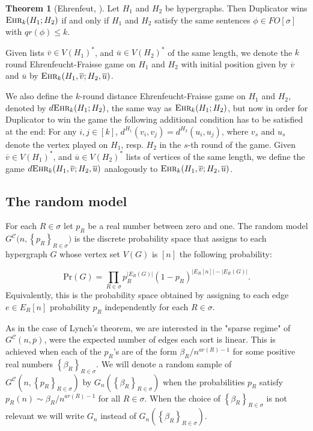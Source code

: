 \documentclass[12pt,notitlepage,a4paper]{article}
\theoremstyle{definition}
\newtheorem{theorem}{Theorem}[section]
\newcommand{\ehr}{\textsc{Ehr}}
\newcommand{\InR}[1]{\left\{ #1_R \right\}_{R\in \sigma}}
\begin{document}
\begin{theorem}
	[Ehrenfeut, \citealp{ehrenfeucht1961application}] Let
	$H_1$ and $H_2$ be hypergraphs.
	Then Duplicator wins $\ehr_k(H_1;H_2)$
	if and only if $H_1$ and $H_2$ satisfy the same 
	sentences $\phi\in FO[\sigma]$ with $qr(\phi)\leq k$.		
\end{theorem}

Given lists $\overline{v}\in V(H_1)^*$, and 
$\overline{u}\in V(H_2)^*$ of the same length, 
we denote the $k$ round 
Ehrenfeucht-Fraisse game on $H_1$ and $H_2$ with initial position given
by $\overline{v}$ and $\overline{u}$ by $\ehr_k(H_1,\overline{v};H_2,\overline{u})$.\par

We also define the $k$-round distance Ehrenfeucht-Fraisse game on 
$H_1$ and $H_2$, denoted by $d\ehr_k(H_1;H_2)$, the same way as
$\ehr_k(H_1;H_2)$, but now in order for Duplicator to win the
game the following additional condition has to be satisfied 
at the end: For any $i,j\in [k]$, $d^{H_1}(v_i,v_j)=d^{H_2}(u_i,u_j)$,
where $v_s$ and $u_s$ denote the vertex played on $H_1$, resp. $H_2$ in the 
$s$-th round of the game. 
Given $\overline{v}\in V(H_1)^*$, and $\overline{u}\in V(H_2)^*$
lists of vertices of the same length,
we define the game 
$d\ehr_k(H_1,\overline{v};H_2,\overline{u})$ analogously to 
$\ehr_k(H_1,\overline{v};H_2,\overline{u})$.


\subsection{The random model} \label{sect:random}

For each $R\in \sigma$ let
$p_R$ be a real number between zero and one.
The random model $G^{\mathcal{C}}\Big(n,\InR{p}\Big)$ 
is the discrete probability space that
assigns to each hypergraph $G$ whose vertex
set $V(G)$ is $[n]$ the following probability:

\[ \mathrm{Pr}(G)=\prod_{R\in \sigma} p_R^{|E_R(G)|}
(1-p_R)^{ \big|E_R[n]\big|-\big|E_R(G)\big|}.	
\]
Equivalently, this is the probability space obtained by 
assigning to each edge $e\in E_R[n]$ probability 
$p_R$ independently for each $R\in \sigma$. \par

As in the case of Lynch's theorem, we are interested in the
"sparse regime" of $G^\mathcal{C}(n,\overline{p})$, were the 
expected number of edges each sort is linear. 
This is achieved when each of the $p_R$'s are 
of the form $\beta_R/n^{ar(R)-1}$ for some 
positive real numbers $\InR{\beta}$.
We will denote a random sample of 
$G^\mathcal{C}\left(n,\left\{p_R\right\}_{R\in\sigma}\right)$
by $G_n\left(\InR{\beta}\right)$ when the probabilities $p_R$
satisfy $p_R(n)\sim \beta_R/n^{ar(R)-1}$ for all $R\in \sigma$.
When the choice of $\InR{\beta}$ is not relevant
we will write $G_n$ instead of 
$G_n\left(\InR{\beta}\right)$.\par
\end{document}

